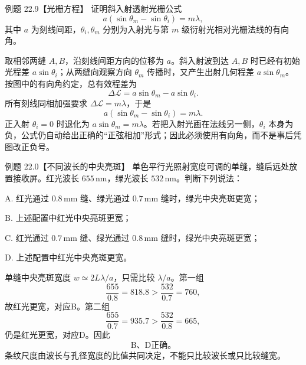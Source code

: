 \begin{origexamplebox}{例题 22.9【光栅方程】}
证明斜入射透射光栅公式
\[
 a(\sin\theta_m-\sin\theta_i)=m\lambda,
\]
其中 $a$ 为刻线间距，$\theta_i,\theta_m$ 分别为入射光与第 $m$ 级衍射光相对光栅法线的有向角。
\end{origexamplebox}
\begin{xesolution}
取相邻两缝 $A,B$，沿刻线间距方向的位移为 $a$。斜入射波到达 $A,B$ 时已经有初始光程差 $a\sin\theta_i$；从两缝向观察方向 $\theta_m$ 传播时，又产生出射几何程差 $a\sin\theta_m$。按图中的有向角约定，总有效程差为
\[
 \Delta\mathcal L=a\sin\theta_m-a\sin\theta_i.
\]
所有刻线同相加强要求 $\Delta\mathcal L=m\lambda$，于是
\[
 \boxed{a(\sin\theta_m-\sin\theta_i)=m\lambda}.
\]
正入射 $\theta_i=0$ 时退化为 $a\sin\theta_m=m\lambda$。若把入射光画在法线另一侧，$\theta_i$ 本身为负，公式仍自动给出正确的“正弦相加”形式；因此必须使用有向角，而不是事后凭图改正负号。
\end{xesolution}
\begin{origexamplebox}{例题 22.0【不同波长的中央亮斑】}
单色平行光照射宽度可调的单缝，缝后远处放置接收屏。红光波长 $655\,\mathrm{nm}$，绿光波长 $532\,\mathrm{nm}$。判断下列说法：

A. 红光通过 $0.8\,\mathrm{mm}$ 缝、绿光通过 $0.7\,\mathrm{mm}$ 缝时，绿光中央亮斑更宽；

B. 上述配置中红光中央亮斑更宽；

C. 红光通过 $0.7\,\mathrm{mm}$ 缝、绿光通过 $0.8\,\mathrm{mm}$ 缝时，绿光中央亮斑更宽；

D. 上述配置中红光中央亮斑更宽。
\end{origexamplebox}
\begin{xesolution}
单缝中央亮斑宽度 $w\simeq2L\lambda/a$，只需比较 $\lambda/a$。第一组
\[
 \frac{655}{0.8}=818.8>\frac{532}{0.7}=760,
\]
故红光更宽，对应B。第二组
\[
 \frac{655}{0.7}=935.7>\frac{532}{0.8}=665,
\]
仍是红光更宽，对应D。因此
\[
 \boxed{\text{B、D正确。}}
\]
条纹尺度由波长与孔径宽度的比值共同决定，不能只比较波长或只比较缝宽。
\end{xesolution}

